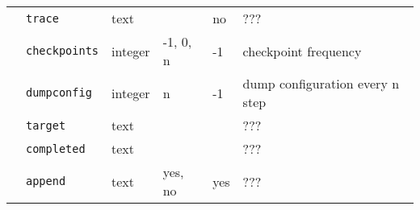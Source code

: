 \begin{table}[h]
\begin{center}
\begin{tabularx}{\textwidth}{l l l l l l }
   &   \texttt{trace}         &  text              &                  & no                & ???                      \\
   &   \texttt{checkpoints}   &  integer           &   -1, 0, n       & -1                & checkpoint frequency \\
   &   \texttt{dumpconfig}    &  integer           &   n              & -1                & dump configuration every n step  \\
   &   \texttt{target}        &  text              &                  &                   & ???  \\
   &   \texttt{completed}     &  text              &                  &                   & ???  \\
   &   \texttt{append}        &  text              &   yes, no        & yes               & ???  \\
\hline

\end{tabularx}
\end{center}
\end{table}

